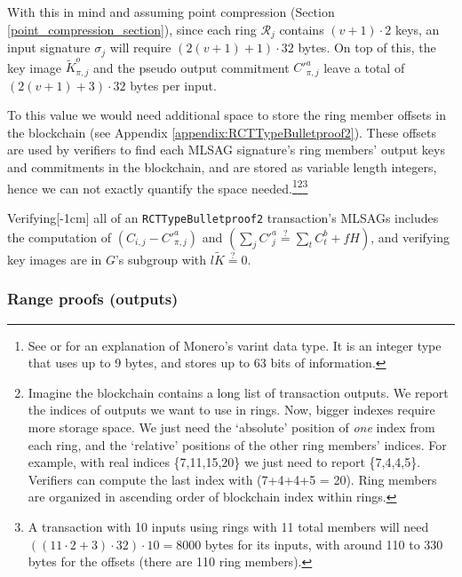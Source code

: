 With this in mind and assuming point compression (Section \ref{point_compression_section}), since each ring \(\mathcal{R}_j\) contains \((v+1) \cdot 2\) keys, an input signature $\sigma_j$ will require \( (2(v+1) + 1) \cdot 32  \) bytes. On top of this, the key image $\tilde{K}^o_{\pi,j}$ and the pseudo output commitment $C'^a_{\pi,j}$ leave a total of $(2(v+1)+3) \cdot 32$ bytes per input.

To this value we would need additional space to store the ring member offsets in the blockchain (see Appendix \ref{appendix:RCTTypeBulletproof2}). These offsets are used by verifiers to find each MLSAG signature's ring members' output keys and commitments in the blockchain, and are stored as variable length integers, hence we can not exactly quantify the space needed.\footnote{See \cite{varint-description} or \cite{varint-spec} for an explanation of Monero's varint data type. It is an integer type that uses up to 9 bytes, and stores up to 63 bits of information.}\footnote{Imagine the blockchain contains a long list of transaction outputs. We report the indices of outputs we want to use in rings. Now, bigger indexes require more storage space. We just need the `absolute' position of {\em one} index from each ring, and the `relative' positions of the other ring members' indices. For example, with real indices \{7,11,15,20\} we just need to report \{7,4,4,5\}. Verifiers can compute the last index with (7+4+4+5 = 20). Ring members are organized in ascending order of blockchain index within rings.}\footnote{A transaction with 10 inputs using rings with 11 total members will need \(((11 \cdot 2 + 3) \cdot 32) \cdot 10 = 8000 \) bytes for its inputs, with around 110 to 330 bytes for the offsets (there are 110 ring members).}%

Verifying[-1cm] all of an {\tt RCTTypeBulletproof2} transaction's MLSAGs includes the computation of \( (C_{i, j} - C'^a_{\pi, j}) \) and \( (\sum_j C'^a_{j} \stackrel{?}{=} \sum_t C^b_{t} + f H)\), and verifying key images are in $G$'s subgroup with $l \tilde{K} \stackrel{?}{=} 0$.

\subsubsection*{Range proofs (outputs)}

